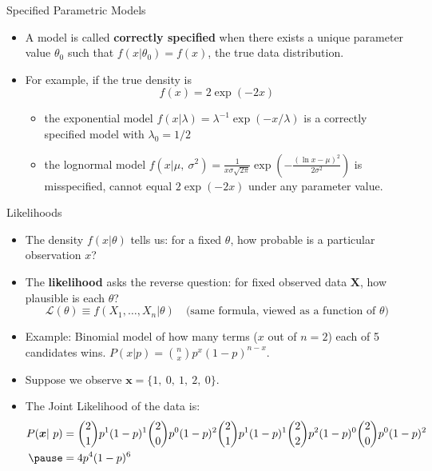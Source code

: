 \documentclass[aspectratio=169, handout, t]{beamer}
\numberwithin{equation}{section}
\begin{document}
\begin{frame}{Specified Parametric Models}
\begin{itemize}
\item A model is called \textbf{correctly specified} when there exists a unique parameter value $\theta_0$ such that $f(x|\theta_0)=f(x)$, the true data distribution.\pause
\item For example, if the true density is $$f(x)=2\exp(-2x)$$
\begin{itemize}
\item the exponential model $f(x|\lambda)=\lambda^{-1}\exp(-x/\lambda)$ is a correctly specified model with $\lambda_0=1/2$\pause
\item the lognormal model $f(x|\mu,\ \sigma^2)=\frac{1}{x\sigma\sqrt{2\pi}}\exp(-\frac{(\ln x-\mu)^2}{2\sigma^2})$ is misspecified, cannot equal $2 \exp(-2x)$ under any parameter value.
\end{itemize}
\end{itemize}

\end{frame}



\begin{frame}{Likelihoods}
\begin{itemize}
\item The density $f(x|\theta)$ tells us: for a fixed $\theta$, how probable is a particular observation $x$?\pause
\item The \textbf{likelihood} asks the reverse question: for fixed observed data $\bm{X}$, how plausible is each $\theta$?
$$\mathcal{L}(\theta)\equiv f(X_1, \ldots, X_n|\theta) \quad\text{(same formula, viewed as a function of }\theta\text{)}$$\pause
\item Example: Binomial model of how many terms ($x$ out of $n=2$) each of 5 candidates wins.  $P(x|p)={n\choose x}p^{x}(1-p)^{n-x}$.\pause
\item Suppose we observe $\bm{x}= \{1,\ 0,\ 1,\ 2,\ 0\}$.\pause
\item The Joint Likelihood of the data is:
\begin{align*}
P(\bm{x}|\ p)&={2\choose 1}p^{1}(1-p)^{1} {2\choose 0}p^{0}(1-p)^{2} {2\choose 1}p^{1}(1-p)^{1}  {2\choose 2}p^{2}(1-p)^{0} {2 \choose 0}p^{0}(1-p)^{2}\\\pause
&=4p^{4}(1-p)^{6}
\end{align*}
\end{itemize}
\end{frame}
\end{document}
